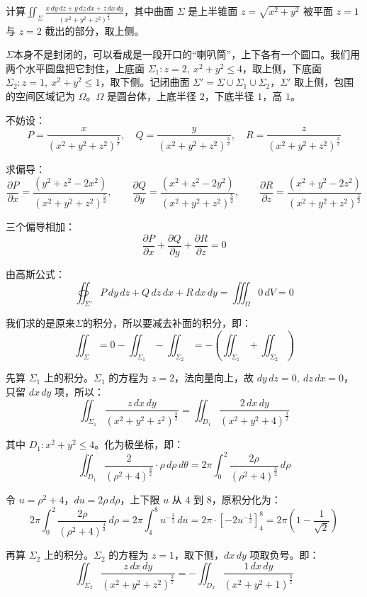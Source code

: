 \begin{myexample}
    计算\(\iint_{\Sigma} \frac{x\,dy\,dz + y\,dz\,dx + z\,dx\,dy}{(x^2+y^2+z^2)^{\frac32}}\)，其中曲面 $\Sigma$ 是上半锥面 $z=\sqrt{x^2+y^2}$ 被平面 $z=1$ 与 $z=2$ 截出的部分，取上侧。

    $\Sigma$本身不是封闭的，可以看成是一段开口的“喇叭筒”，上下各有一个圆口。我们用两个水平圆盘把它封住，上底面 $\Sigma_1: z=2,\ x^2+y^2\le 4$，取上侧，下底面 $\Sigma_2: z=1,\ x^2+y^2\le 1$，取下侧。记闭曲面 $\Sigma' = \Sigma \cup \Sigma_1 \cup \Sigma_2$，$\Sigma'$ 取上侧，包围的空间区域记为 $\Omega$。$\Omega$ 是圆台体，上底半径 $2$，下底半径 $1$，高 $1$。

    不妨设：
\[
P=\frac{x}{(x^2+y^2+z^2)^{\frac32}},\quad
Q=\frac{y}{(x^2+y^2+z^2)^{\frac32}},\quad
R=\frac{z}{(x^2+y^2+z^2)^{\frac32}}
\]

求偏导：
\[
\frac{\partial P}{\partial x} = \frac{(y^2+z^2-2x^2)}{(x^2+y^2+z^2)^{\frac52}},\qquad
\frac{\partial Q}{\partial y} = \frac{(x^2+z^2-2y^2)}{(x^2+y^2+z^2)^{\frac52}},\qquad
\frac{\partial R}{\partial z} = \frac{(x^2+y^2-2z^2)}{(x^2+y^2+z^2)^{\frac52}}
\]

三个偏导相加：
\[
\frac{\partial P}{\partial x} + \frac{\partial Q}{\partial y} + \frac{\partial R}{\partial z} = 0
\]

由高斯公式：
\[
\oiint_{\Sigma'} P\,dy\,dz + Q\,dz\,dx + R\,dx\,dy = \iiint_{\Omega} 0\,dV = 0
\]

我们求的是原来\(\Sigma\)的积分，所以要减去补面的积分，即：
\[
\iint_{\Sigma} = 0 -\iint_{\Sigma_1} - \iint_{\Sigma_2} = -(\iint_{\Sigma_1} + \iint_{\Sigma_2})
\]

先算 $\Sigma_1$ 上的积分。$\Sigma_1$ 的方程为 $z=2$，法向量向上，故 $dy\,dz=0,\ dz\,dx=0$，只留 $dx\,dy$ 项，所以：
\[
\iint_{\Sigma_1} \frac{z\,dx\,dy}{(x^2+y^2+z^2)^{\frac32}}
= \iint_{D_1} \frac{2\,dx\,dy}{(x^2+y^2+4)^{\frac32}}
\]

其中 $D_1: x^2+y^2\le 4$。化为极坐标，即：
\[
\iint_{D_1} \frac{2}{(\rho^2+4)^{\frac32}}\cdot \rho\,d\rho\,d\theta
= 2\pi \int_0^2 \frac{2\rho}{(\rho^2+4)^{\frac32}}\,d\rho
\]

令 $u=\rho^2+4$，$du=2\rho\,d\rho$，上下限 $u$ 从 $4$ 到 $8$，原积分化为：
\[2\pi \int_0^2 \frac{2\rho}{(\rho^2+4)^{\frac32}}\,d\rho
= 2\pi \int_4^8 u^{-\frac32}\,du
= 2\pi \cdot \left[ -2u^{-\frac12} \right]_4^8
= 2\pi ( 1 - \frac{1}{\sqrt{2}} )
\]

再算 $\Sigma_2$ 上的积分。$\Sigma_2$ 的方程为 $z=1$，取下侧，$dx\,dy$ 项取负号。即：
\[
\iint_{\Sigma_2} \frac{z\,dx\,dy}{(x^2+y^2+z^2)^{\frac{3}{2}}}
= -\iint_{D_2} \frac{1\,dx\,dy}{(x^2+y^2+1)^{\frac{3}{2}}}
\]


\end{myexample}
